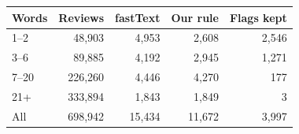 \begin{tabular}{@{}lrrrr@{}}
\toprule
Words & Reviews & fastText & Our rule & Flags kept \\
\midrule
1–2 & 48,903 & 4,953 & 2,608 & 2,546 \\
3–6 & 89,885 & 4,192 & 2,945 & 1,271 \\
7–20 & 226,260 & 4,446 & 4,270 & 177 \\
21+ & 333,894 & 1,843 & 1,849 & 3 \\
\midrule
All & 698,942 & 15,434 & 11,672 & 3,997 \\
\bottomrule
\end{tabular}
